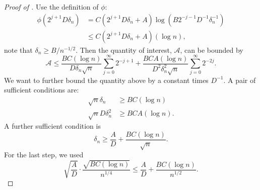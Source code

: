 \documentclass[12pt]{article}
\begin{document}
\begin{appendices}
\begin{proof}[Proof of ]
Use the definition of $\phi$:
\begin{equation*}
\begin{aligned}
    \phi(2^{j+1} D\delta_n) 
    & = C(2^{j+1} D\delta_n + A) \log(B2^{-j-1}D^{-1}\delta_n^{-1})\\
    & \leq C(2^{j+1} D\delta_n + A)(\log n),
\end{aligned}
\end{equation*}
note that $\delta_n \geq B/n^{-1/2}$. Then the quantity of interest, $\mathcal{A}$, can be bounded by
\begin{equation*}
    \mathcal{A} \leq \frac{BC(\log n)}{D\delta_n \sqrt{n}} \sum_{j=0}^\infty 2^{-j+1} + \frac{BCA(\log n)}{D^2\delta_n^2\sqrt{n}} \sum_{j=0}^\infty 2^{-2j}.
\end{equation*}
We want to further bound the quantity above by a constant times $D^{-1}$. A pair of sufficient conditions are:
\begin{equation*}
    \begin{aligned}
        \sqrt{n} \delta_n &\geq BC(\log n)\\
        \sqrt{n}D\delta_n^2 & \geq BCA (\log n).
    \end{aligned}
\end{equation*}
A further sufficient condition is
\begin{equation*}
    \delta_n \geq \frac{A}{D} + \frac{BC(\log n)}{\sqrt{n}}.
\end{equation*}
For the last step, we used
\begin{equation*}
    \sqrt{\frac{A}{D}}\cdot \frac{\sqrt{BC(\log n)}}{n^{1/4}} \leq \frac{A}{D} +\frac{BC(\log n)}{n^{1/2}}.
\end{equation*}
\end{proof}



\end{appendices}
\end{document}
